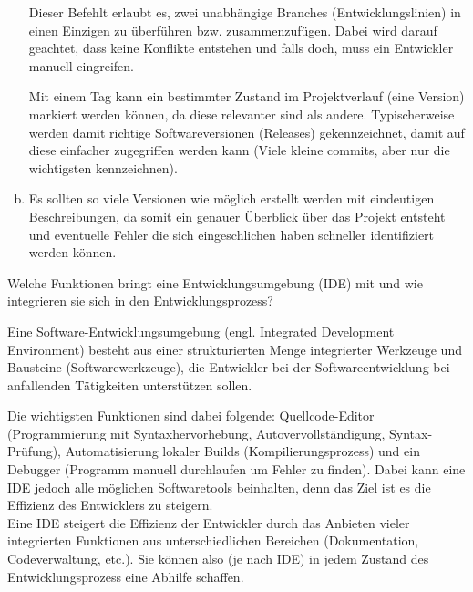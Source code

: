 \begin{loesung}
\begin{enumerate}[(a)]
                \begin{highlighting}[Merge]
                    Dieser Befehlt erlaubt es, zwei unabhängige Branches (Entwicklungslinien) in einen Einzigen zu überführen bzw. zusammenzufügen. Dabei wird darauf geachtet, dass keine Konflikte entstehen und falls doch, muss ein Entwickler manuell eingreifen.
                \end{highlighting}
            
                \begin{highlighting}[Tags]
                    Mit einem Tag kann ein bestimmter Zustand im Projektverlauf (eine Version) markiert werden können, da diese relevanter sind als andere. Typischerweise werden damit richtige Softwareversionen (Releases) gekennzeichnet, damit auf diese einfacher zugegriffen werden kann (Viele kleine commits, aber nur die wichtigsten kennzeichnen).
                \end{highlighting}
            
                \item Es sollten so viele Versionen wie möglich erstellt werden mit eindeutigen Beschreibungen, da somit ein genauer Überblick über das Projekt entsteht und eventuelle Fehler die sich eingeschlichen haben schneller identifiziert werden können.
            \end{enumerate}
        \end{loesung}
	
    
    
        \begin{aufgabe}
            Welche Funktionen bringt eine Entwicklungsumgebung (IDE) mit und wie integrieren sie sich in den Entwicklungsprozess?
        \end{aufgabe}
    
        \begin{loesung}\:
            \begin{highlighting}[IDE]
                Eine Software-Entwicklungsumgebung (engl. Integrated Development Environment) besteht aus einer strukturierten Menge integrierter Werkzeuge und Bausteine (Softwarewerkzeuge), die Entwickler bei der Softwareentwicklung bei anfallenden Tätigkeiten unterstützen sollen.
            \end{highlighting}
            Die wichtigsten Funktionen sind dabei folgende: Quellcode-Editor (Programmierung mit Syntaxhervorhebung, Autovervollständigung, Syntax-Prüfung), Automatisierung lokaler Builds (Kompilierungsprozess) und ein Debugger (Programm manuell durchlaufen um Fehler zu finden). Dabei kann eine IDE jedoch alle möglichen Softwaretools beinhalten, denn das Ziel ist es die Effizienz des Entwicklers zu steigern.\\[.3cm]
            Eine IDE steigert die Effizienz der Entwickler durch das Anbieten vieler integrierten Funktionen aus unterschiedlichen Bereichen (Dokumentation, Codeverwaltung, etc.). Sie können also (je nach IDE) in jedem Zustand des Entwicklungsprozess eine Abhilfe schaffen.
        \end{loesung}
	
